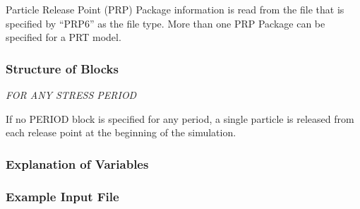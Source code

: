 Particle Release Point (PRP) Package information is read from the file that is specified by ``PRP6'' as the file type.  More than one PRP Package can be specified for a PRT model. 

\vspace{5mm}
\subsubsection{Structure of Blocks}



\vspace{5mm}
\noindent \textit{FOR ANY STRESS PERIOD}

\packageperioddescription \: If no PERIOD block is specified for any period, a single particle is released from each release point at the beginning of the simulation.

\vspace{5mm}
\subsubsection{Explanation of Variables}
\begin{description}

\end{description}

\vspace{5mm}
\subsubsection{Example Input File}


